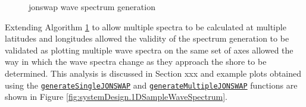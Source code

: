 \begin{figure}[H]
  \vspace{0.5cm}
  \centering
  \captionsetup{type=figure}
  \begin{minipage}{.75\linewidth}
    \begin{algorithm}[H]
      \caption{\acs{jonswap} wave spectrum generation\label{alg:jonswap}}

      \DontPrintSemicolon
      \SetAlgoLined


      \BlankLine
      \vspace{0.5cm}
    \end{algorithm}
  \end{minipage}
\end{figure}


Extending Algorithm \ref{alg:jonswap} to allow multiple spectra to be calculated at multiple latitudes and longitudes allowed the validity of the spectrum generation to be validated as plotting multiple wave spectra on the same set of axes allowed the way in which the wave spectra change as they approach the shore to be determined. This analysis is discussed in Section xxx and example plots obtained using the \href{https://github.com/JNSRYA006/sar-parameter-extraction-pipeline/blob/main/functions/waveSpectra/generateSingleJONSWAP.m}{\lstinline{generateSingleJONSWAP}} and \href{https://github.com/JNSRYA006/sar-parameter-extraction-pipeline/blob/main/functions/waveSpectra/generateMultipleJONSWAP.m}{\lstinline{generateMultipleJONSWAP}} functions are shown in Figure \ref{fig:systemDesign.1DSampleWaveSpectrum}. 

